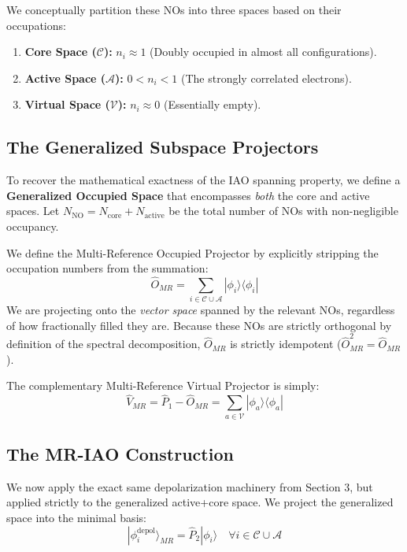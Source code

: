 \documentclass[11pt]{article}
\begin{document}
We conceptually partition these NOs into three spaces based on their occupations:
\begin{enumerate}
    \item \textbf{Core Space ($\mathcal{C}$):} $n_i \approx 1$ (Doubly occupied in almost all configurations).
    \item \textbf{Active Space ($\mathcal{A}$):} $0 < n_i < 1$ (The strongly correlated electrons).
    \item \textbf{Virtual Space ($\mathcal{V}$):} $n_i \approx 0$ (Essentially empty).
\end{enumerate}

\subsection{The Generalized Subspace Projectors}

To recover the mathematical exactness of the IAO spanning property, we define a \textbf{Generalized Occupied Space} that encompasses \textit{both} the core and active spaces. Let $N_{\text{NO}} = N_{\text{core}} + N_{\text{active}}$ be the total number of NOs with non-negligible occupancy.

We define the Multi-Reference Occupied Projector by explicitly stripping the occupation numbers from the summation:
\begin{equation}
    \hat{O}_{MR} = \sum_{i \in \mathcal{C} \cup \mathcal{A}} |\phi_i\rangle \langle \phi_i|
\end{equation}
We are projecting onto the \textit{vector space} spanned by the relevant NOs, regardless of how fractionally filled they are. Because these NOs are strictly orthogonal by definition of the spectral decomposition, $\hat{O}_{MR}$ is strictly idempotent ($\hat{O}_{MR}^2 = \hat{O}_{MR}$).

The complementary Multi-Reference Virtual Projector is simply:
\begin{equation}
    \hat{V}_{MR} = \hat{P}_1 - \hat{O}_{MR} = \sum_{a \in \mathcal{V}} |\phi_a\rangle \langle \phi_a|
\end{equation}

\subsection{The MR-IAO Construction}

We now apply the exact same depolarization machinery from Section 3, but applied strictly to the generalized active+core space. We project the generalized space into the minimal basis:
\begin{equation}
    |\phi_i^{\text{depol}}\rangle_{MR} = \hat{P}_2 |\phi_i\rangle \quad \forall i \in \mathcal{C} \cup \mathcal{A}
\end{equation}
\end{document}
